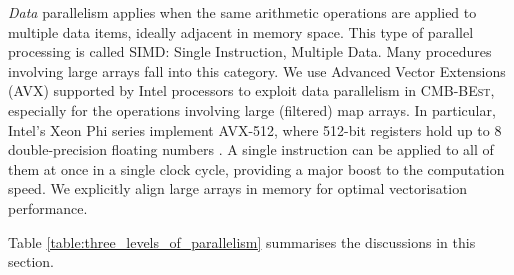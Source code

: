 \textit{Data} parallelism applies when the same arithmetic operations are applied to multiple data items, ideally adjacent in memory space. This type of parallel processing is called SIMD: Single Instruction, Multiple Data. Many procedures involving large arrays fall into this category. We use Advanced Vector Extensions (AVX) supported by Intel processors to exploit data parallelism in \textsc{CMB-BEst}, especially for the operations involving large (filtered) map arrays. In particular, Intel's Xeon Phi series implement AVX-512, where 512-bit registers hold up to 8 double-precision floating numbers \cite{Jeffers2016intel}. A single instruction can be applied to all of them at once in a single clock cycle, providing a major boost to the computation speed. We explicitly align large arrays in memory for optimal vectorisation performance.

Table \ref{table:three_levels_of_parallelism} summarises the discussions in this section.

